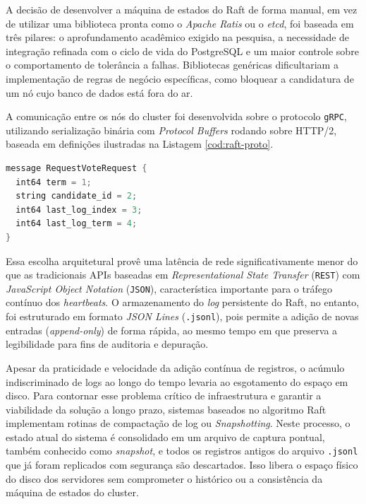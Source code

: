         A decisão de desenvolver a máquina de estados do Raft de forma manual, em vez de utilizar uma biblioteca pronta como o \textit{Apache Ratis} ou o \textit{etcd}, foi baseada em três pilares: o aprofundamento acadêmico exigido na pesquisa, a necessidade de integração refinada com o ciclo de vida do PostgreSQL e um maior controle sobre o comportamento de tolerância a falhas. Bibliotecas genéricas dificultariam a implementação de regras de negócio específicas, como bloquear a candidatura de um nó cujo banco de dados está fora do ar.
    
        A comunicação entre os nós do cluster foi desenvolvida sobre o protocolo \verb|gRPC|, utilizando serialização binária com \textit{Protocol Buffers} rodando sobre HTTP/2, baseada em definições ilustradas na Listagem \ref{cod:raft-proto}. 
        
\begin{lstlisting}[language=Java, caption={Definição parcial do serviço Raft em Protocol Buffers (\texttt{.proto})}, label={cod:raft-proto}]
message RequestVoteRequest {
  int64 term = 1;
  string candidate_id = 2;
  int64 last_log_index = 3;
  int64 last_log_term = 4;
}
\end{lstlisting}

        Essa escolha arquitetural provê uma latência de rede significativamente menor do que as tradicionais APIs baseadas em \textit{Representational State Transfer} (\verb|REST|) com \textit{JavaScript Object Notation} (\verb|JSON|), característica importante para o tráfego contínuo dos \textit{heartbeats}. O armazenamento do \textit{log} persistente do Raft, no entanto, foi estruturado em formato \textit{JSON Lines} (\verb|.jsonl|), pois permite a adição de novas entradas (\textit{append-only}) de forma rápida, ao mesmo tempo em que preserva a legibilidade para fins de auditoria e depuração.

        Apesar da praticidade e velocidade da adição contínua de registros, o acúmulo indiscriminado de logs ao longo do tempo levaria ao esgotamento do espaço em disco. Para contornar esse problema crítico de infraestrutura e garantir a viabilidade da solução a longo prazo, sistemas baseados no algoritmo Raft implementam rotinas de compactação de log ou \textit{Snapshotting}. Neste processo, o estado atual do sistema é consolidado em um arquivo de captura pontual, também conhecido como \textit{snapshot}, e todos os registros antigos do arquivo \verb|.jsonl| que já foram replicados com segurança são descartados. Isso libera o espaço físico do disco dos servidores sem comprometer o histórico ou a consistência da máquina de estados do cluster.
    
